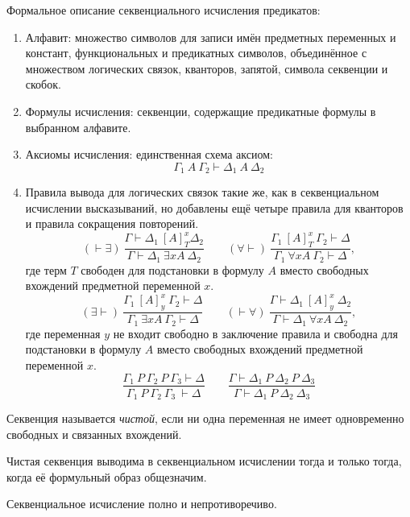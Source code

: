 Формальное описание секвенциального исчисления предикатов:
\begin{enumerate}
	\item Алфавит: множество символов для записи имён предметных переменных и констант, функциональных и предикатных символов, объединённое с множеством логических связок, кванторов, запятой, символа секвенции и скобок.
	\item Формулы исчисления: секвенции, содержащие предикатные формулы в выбранном алфавите.
	\item Аксиомы исчисления: единственная схема аксиом:
		$$ \Gamma_1 ~ A ~ \Gamma_2 \vdash \Delta_1 ~ A ~ \Delta_2 $$
	\item Правила вывода для логических связок такие же, как в секвенциальном исчислении высказываний, но добавлены ещё четыре правила для кванторов и правила сокращения повторений.
		$$ (\vdash \exists) ~ \frac{\Gamma \vdash \Delta_1 ~ [A]_T^x \Delta_2}{\Gamma \vdash \Delta_1 ~ \exists x A ~ \Delta_2} \qquad (\forall \vdash) ~ \frac{\Gamma_1 ~ [A]_T^x ~ \Gamma_2 \vdash \Delta}{\Gamma_1 ~ \forall x A ~ \Gamma_2 \vdash \Delta}, $$
		где терм $ T $ свободен для подстановки в формулу $ A $ вместо свободных вхождений предметной переменной $ x $.
		$$ (\exists \vdash) ~ \frac{\Gamma_1 ~ [A]_y^x ~ \Gamma_2 \vdash \Delta}{\Gamma_1 ~ \exists x A ~ \Gamma_2 \vdash \Delta} \qquad (\vdash \forall) ~ \frac{\Gamma \vdash \Delta_1 ~ [A]_y^x ~ \Delta_2}{\Gamma \vdash \Delta_1 ~ \forall x A ~ \Delta_2}, $$
		где переменная $ y $ не входит свободно в заключение правила и свободна для подстановки в формулу $ A $ вместо свободных вхождений предметной переменной $ x $.
		$$ \frac{\Gamma_1 ~ P ~ \Gamma_2 ~ P ~ \Gamma_3 \vdash \Delta}{\Gamma_1 ~ P ~ \Gamma_2 ~ \Gamma_3 ~ \vdash \Delta} \qquad \frac{\Gamma \vdash \Delta_1 ~ P ~ \Delta_2 ~ P ~ \Delta_3}{\Gamma \vdash \Delta_1 ~ P ~ \Delta_2 ~ \Delta_3} $$
\end{enumerate}

\begin{definition}
	Секвенция называется \emph{чистой}, если ни одна переменная не имеет одновременно свободных и связанных вхождений.
\end{definition}

\begin{theorem}
	Чистая секвенция выводима в секвенциальном исчислении тогда и только тогда, когда её формульный образ общезначим.
\end{theorem}

\begin{theorem}
	Секвенциальное исчисление полно и непротиворечиво.
\end{theorem}

